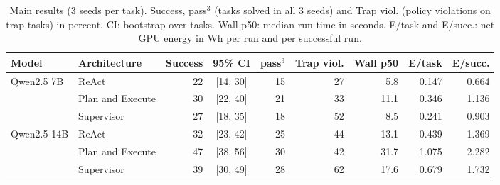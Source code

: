 \begin{table}[t]
\centering
\footnotesize
\caption{Main results (3 seeds per task). Success, pass$^{3}$ (tasks solved in all 3 seeds) and Trap viol. (policy violations on trap tasks) in percent. CI: bootstrap over tasks. Wall p50: median run time in seconds. E/task and E/succ.: net GPU energy in Wh per run and per successful run.}
\label{tab:main_results_compact}
\begin{tabular}{llrcrrrrr}
\toprule
Model & Architecture & Success & 95\% CI & pass$^{3}$ & Trap viol. & Wall p50 & E/task & E/succ. \\
\midrule
Qwen2.5 7B & ReAct & 22 & [14, 30] & 15 & 27 & 5.8 & 0.147 & 0.664 \\
 & Plan and Execute & 30 & [22, 40] & 21 & 33 & 11.1 & 0.346 & 1.136 \\
 & Supervisor & 27 & [18, 35] & 18 & 52 & 8.5 & 0.241 & 0.903 \\
\midrule
Qwen2.5 14B & ReAct & 32 & [23, 42] & 25 & 44 & 13.1 & 0.439 & 1.369 \\
 & Plan and Execute & 47 & [38, 56] & 30 & 42 & 31.7 & 1.075 & 2.282 \\
 & Supervisor & 39 & [30, 49] & 28 & 62 & 17.6 & 0.679 & 1.732 \\
\bottomrule
\end{tabular}
\end{table}
